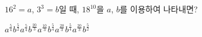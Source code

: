 $16^2=a$, $3^3=b$일 때, $18^{10}$을 $a$, $b$를 이용하여 나타내면?
\begin{choices32}{$a^{\frac{5}{4}}b^{\frac{5}{2}}$}{$a^{\frac{5}{4}}b^{\frac{20}{3}}$}{$a^{\frac{10}{3}}b^{\frac{5}{4}}$}{$a^{\frac{20}{3}}b^{\frac{5}{4}}$}{$a^{\frac{20}{3}}b^{\frac{5}{2}}$}\end{choices32}
